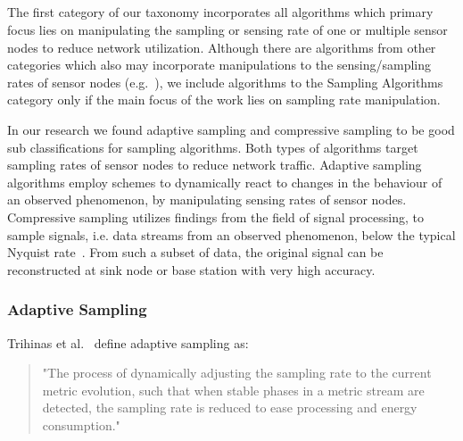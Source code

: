 \subsection{\catI} %
\label{sec:catI}

The first category of our taxonomy incorporates all algorithms which primary
focus lies on manipulating the sampling or sensing rate of one or multiple
sensor nodes to reduce network utilization. Although there are algorithms from
other categories which also may incorporate manipulations to the
sensing/sampling rates of sensor nodes (e.g.~\cite{trihinas2015adam}), we
include algorithms to the Sampling Algorithms category only if the main focus
of the work lies on sampling rate manipulation. 


In our research we found adaptive sampling and compressive sampling to be good
sub classifications for sampling algorithms. Both types of algorithms target
sampling rates of sensor nodes to reduce network traffic. Adaptive sampling
algorithms employ schemes to dynamically react to changes in the behaviour of
an observed phenomenon, by manipulating sensing rates of sensor nodes.
Compressive sampling utilizes findings from the field of signal processing, to
sample signals, i.e. data streams from an observed phenomenon, below the
typical Nyquist rate~\cite{candes2008introduction}. From such a subset of data,
the original signal can be reconstructed at sink node or base station with very
high accuracy.

\subsubsection{Adaptive Sampling}
\label{sec:Adaptive Sampling}

Trihinas et al.~\cite{trihinas2015adam} define adaptive sampling as:

\begin{quote}
    "The process of dynamically adjusting the sampling rate to the current
    metric evolution, such that when stable phases in a metric stream are
    detected, the sampling rate is reduced to ease processing and energy
    consumption."
\end{quote}


